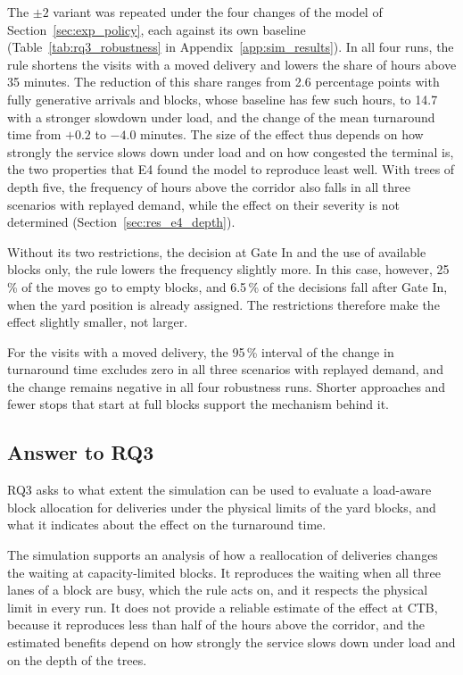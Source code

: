 The $\pm 2$ variant was repeated under the four changes of the model of
Section~\ref{sec:exp_policy}, each against its own baseline
(Table~\ref{tab:rq3_robustness} in Appendix~\ref{app:sim_results}). In all four
runs, the rule shortens the visits with a moved delivery and lowers the share of hours
above 35 minutes. The reduction of this share ranges from 2.6 percentage points with fully generative arrivals and blocks, whose baseline
has few such hours, to 14.7 with a stronger slowdown under load, and the change of
the mean turnaround time from $+0.2$ to $-4.0$ minutes. The size of the effect thus
depends on how strongly the service slows down under load and on how congested the
terminal is, the two properties that E4 found the model to reproduce least well.
With trees of depth five, the frequency of hours above the corridor also falls in all
three scenarios with replayed demand, while the effect on their severity is not
determined (Section~\ref{sec:res_e4_depth}).

Without its two restrictions, the decision at Gate In and the use of available blocks
only, the rule lowers the frequency slightly more. In this
case, however, 25\,\% of the moves go to empty blocks, and 6.5\,\% of the decisions
fall after Gate In, when the yard position is already assigned. The restrictions
therefore make the effect slightly smaller, not larger.

\label{sec:res_s1_conclusion}
For the visits with a moved delivery, the 95\,\% interval of the change in turnaround
time excludes zero in all three scenarios with replayed demand, and the change remains
negative in all four robustness runs. Shorter approaches and fewer stops that start at
full blocks support the mechanism behind it.

\subsection{Answer to RQ3}
\label{sec:res_rq3}

RQ3 asks to what extent the simulation can be used to evaluate a load-aware block
allocation for deliveries under the physical limits of the yard blocks, and what
it indicates about the effect on the turnaround time.

The simulation supports an analysis of how a reallocation of deliveries changes the
waiting at capacity-limited blocks. It reproduces the waiting when all three lanes of a
block are busy, which the rule acts on, and it respects the physical limit in every run.
It does not provide a reliable estimate of the effect at CTB, because it reproduces less
than half of the hours above the corridor, and the estimated benefits depend on how
strongly the service slows down under load and on the depth of the trees.

